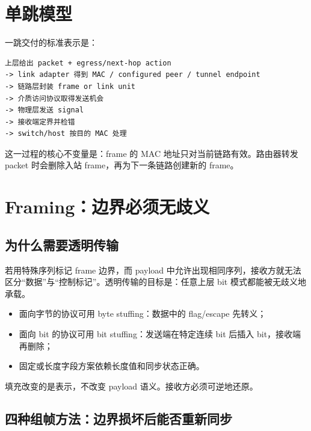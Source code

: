 \documentclass[UTF8,fontset=none,11pt,a4paper]{ctexart}
\providecommand{\tightlist}{\setlength{\itemsep}{0pt}\setlength{\parskip}{0pt}}
\begin{document}
\section{单跳模型}\label{2-ux5355ux8df3ux6a21ux578b}

一跳交付的标准表示是：

\begin{lstlisting}
上层给出 packet + egress/next-hop action
-> link adapter 得到 MAC / configured peer / tunnel endpoint
-> 链路层封装 frame or link unit
-> 介质访问协议取得发送机会
-> 物理层发送 signal
-> 接收端定界并检错
-> switch/host 按目的 MAC 处理
\end{lstlisting}

这一过程的核心不变量是：frame 的 MAC 地址只对当前链路有效。路由器转发
packet 时会删除入站 frame，再为下一条链路创建新的 frame。

\section{Framing：边界必须无歧义}\label{3-framingux8fb9ux754cux5fc5ux987bux65e0ux6b67ux4e49}

\subsection{为什么需要透明传输}\label{31-ux4e3aux4ec0ux4e48ux9700ux8981ux900fux660eux4f20ux8f93}

若用特殊序列标记 frame 边界，而 payload
中允许出现相同序列，接收方就无法区分``数据''与``控制标记''。透明传输的目标是：任意上层
bit 模式都能被无歧义地承载。

\begin{itemize}
\tightlist
\item
  面向字节的协议可用 byte stuffing：数据中的 flag/escape 先转义；
\item
  面向 bit 的协议可用 bit stuffing：发送端在特定连续 bit 后插入
  bit，接收端再删除；
\item
  固定或长度字段方案依赖长度值和同步状态正确。
\end{itemize}

填充改变的是表示，不改变 payload 语义。接收方必须可逆地还原。

\subsection{四种组帧方法：边界损坏后能否重新同步}
\end{document}
